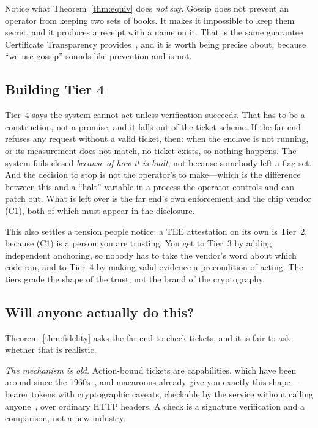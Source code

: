 \documentclass[11pt]{article}
\begin{document}
Notice what Theorem~\ref{thm:equiv} does \emph{not} say. Gossip does not
prevent an operator from keeping two sets of books. It makes it impossible to
keep them secret, and it produces a receipt with a name on it. That is the
same guarantee Certificate Transparency provides~\cite{rfc6962,chase2016}, and
it is worth being precise about, because ``we use gossip'' sounds like
prevention and is not.

\subsection{Building Tier 4}
\label{sec:tier4}
Tier~4 says the system cannot act unless verification succeeds. That has to be
a construction, not a promise, and it falls out of the ticket scheme. If the
far end refuses any request without a valid ticket, then: when the enclave is
not running, or its measurement does not match, no ticket exists, so nothing
happens. The system fails closed \emph{because of how it is built}, not
because somebody left a flag set. And the decision to stop is not the
operator's to make---which is the difference between this and a ``halt''
variable in a process the operator controls and can patch out. What is left
over is the far end's own enforcement and the chip vendor (C1), both of which
must appear in the disclosure.

This also settles a tension people notice: a TEE attestation on its own is
Tier~2, because (C1) is a person you are trusting. You get to Tier~3 by adding
independent anchoring, so nobody has to take the vendor's word about which
code ran, and to Tier~4 by making valid evidence a precondition of acting. The
tiers grade the shape of the trust, not the brand of the cryptography.

\subsection{Will anyone actually do this?}
\label{sec:deploy}

Theorem~\ref{thm:fidelity} asks the far end to check tickets, and it is fair
to ask whether that is realistic.

\emph{The mechanism is old.} Action-bound tickets are capabilities, which have
been around since the 1960s~\cite{dennis1966,levy1984}, and macaroons already
give you exactly this shape---bearer tokens with cryptographic caveats,
checkable by the service without calling anyone~\cite{macaroons}, over
ordinary HTTP headers. A check is a signature verification and a comparison,
not a new industry.
\end{document}

